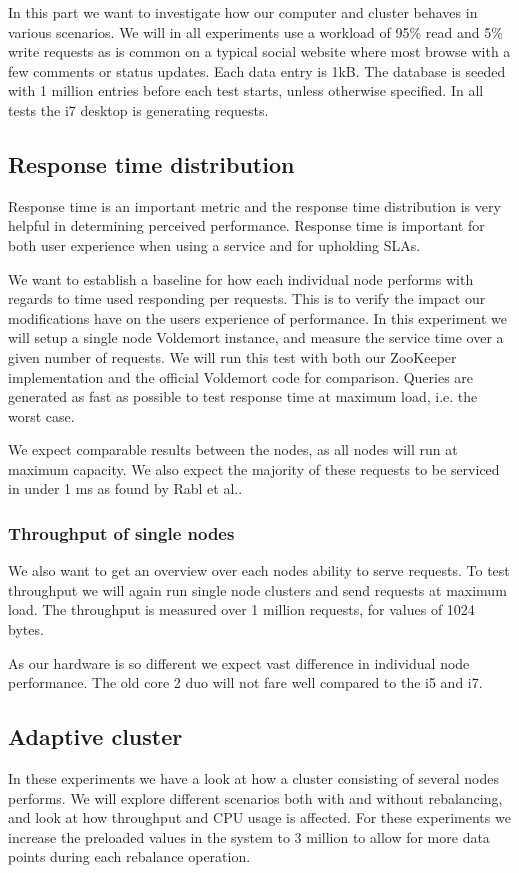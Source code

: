 In this part we want to investigate how our computer and cluster behaves in various scenarios. We will in all experiments use a workload of 95\% read and 5\% write requests as is common on a typical social website where most browse with a few comments or status updates. Each data entry is 1kB. The database is seeded with 1 million entries before each test starts, unless otherwise specified. In all tests the i7 desktop is generating requests. 

\subsection{Response time distribution}
Response time is an important metric and the response time distribution is very helpful in determining perceived performance. Response time is important for both user experience when using a service and for upholding SLAs.

We want to establish a baseline for how each individual node performs with regards to time used responding per requests. This is to verify the impact our modifications have on the users experience of performance. In this experiment we will setup a single node Voldemort instance, and measure the service time over a given number of requests. We will run this test with both our ZooKeeper implementation and the official Voldemort code for comparison. 
Queries are generated as fast as possible to test response time at maximum load, i.e. the worst case.

We expect comparable results between the nodes, as all nodes will run at maximum capacity. We also expect the majority of these requests to be serviced in under 1 ms as found by Rabl et al.\cite{Rabl:2012:SBD:2367502.2367512}.

\subsubsection{Throughput of single nodes}
We also want to get an overview over each nodes ability to serve requests. To test throughput we will again run single node clusters and send requests at maximum load. The throughput is measured over 1 million requests, for values of 1024 bytes. 

As our hardware is so different we expect vast difference in individual node performance. The old core 2 duo will not fare well compared to the i5 and i7. 

\subsection{Adaptive cluster}
In these experiments we have a look at how a cluster consisting of several nodes performs. We will explore different scenarios both with and without rebalancing, and look at how throughput and CPU usage is affected. For these experiments we increase the preloaded values in the system to 3 million to allow for more data points during each rebalance operation. 

